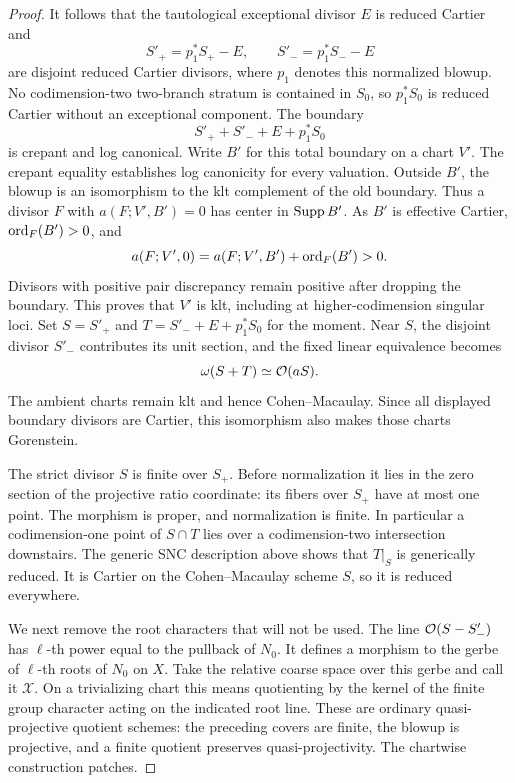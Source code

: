 \begin{proof}
It follows that the tautological exceptional divisor $E$ is
reduced Cartier and
\[
 S'_+=p_1^*S_+-E,\qquad S'_-=p_1^*S_--E
\]
are disjoint reduced Cartier divisors, where $p_1$ denotes this
normalized blowup.  No codimension-two two-branch stratum is
contained in $S_0$, so $p_1^*S_0$ is reduced Cartier without an
exceptional component.  The boundary
\[
 S'_++S'_-+E+p_1^*S_0
\]
is crepant and log canonical.  Write $B'$ for this total
boundary on a chart $V'$.  The crepant equality establishes
log canonicity for every valuation.  Outside $B'$, the
blowup is an isomorphism to the klt complement of the old
boundary.  Thus a divisor $F$ with
$a(F;V',B')=0$ has center in $\operatorname{Supp} B'$.  As $B'$ is
effective Cartier, $\operatorname{ord}_F(B')>0$, and
\[
 a(F;V',0)=a(F;V',B')+\operatorname{ord}_F(B')>0.
\]
Divisors with positive pair discrepancy remain positive
after dropping the boundary.  This proves that $V'$ is
klt, including at higher-codimension singular loci.  Set
$S=S'_+$ and $T=S'_-+E+p_1^*S_0$ for the moment.
Near $S$, the disjoint divisor $S'_-$ contributes its unit
section, and the fixed linear equivalence becomes
\[
 \omega(S+T)\simeq\mathcal{O}(aS).
\]
The ambient charts remain klt and hence Cohen--Macaulay.
Since all displayed boundary divisors are Cartier, this
isomorphism also makes those charts Gorenstein.

The strict divisor $S$ is finite over $S_+$.
Before normalization it lies in the zero section of the
projective ratio coordinate: its fibers over $S_+$ have at
most one point.  The morphism is proper, and normalization is
finite.  In particular a codimension-one point of $S\cap T$
lies over a codimension-two intersection downstairs.  The
generic SNC description above shows that $T|_S$ is generically
reduced.  It is Cartier on the Cohen--Macaulay scheme $S$,
so it is reduced everywhere.

We next remove the root characters that will not be used.
The line $\mathcal{O}(S-S'_-)$ has $\ell$-th power equal to the pullback
of $N_0$.  It defines a morphism to the gerbe of $\ell$-th roots
of $N_0$ on $X$.  Take the relative coarse space over this
gerbe and call it $\mathcal X$.  On a trivializing chart this
means quotienting by the kernel of the finite group character
acting on the indicated root line.  These are ordinary
quasi-projective quotient schemes: the preceding covers are
finite, the blowup is projective, and a finite quotient preserves
quasi-projectivity.  The chartwise construction patches.


\end{proof}
